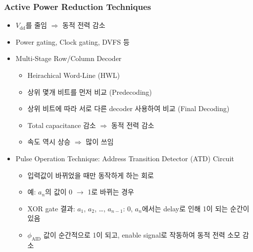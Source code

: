 \subsubsection*{Active Power Reduction Techniques}
\begin{itemize}
    \item $V_{\mathrm{dd}}$를 줄임 $\Rightarrow$ 동적 전력 감소
    \item Power gating, Clock gating, DVFS 등
    \item Multi-Stage Row/Column Decoder
    \begin{itemize}
        \item Heirachical Word-Line (HWL)
        \item 상위 몇개 비트를 먼저 비교 (Predecoding) 
        \item 상위 비트에 따라 서로 다른 decoder 사용하여 비교 (Final Decoding)
        \item Total capacitance 감소 $\Rightarrow$ 동적 전력 감소
        \item 속도 역시 상승 $\Rightarrow$ 많이 쓰임
    \end{itemize}
    \item Pulse Operation Technique: Address Transition Detector (ATD) Circuit
    \begin{itemize}
        \item 입력값이 바뀌었을 때만 동작하게 하는 회로
        \item 예: $a_n$의 값이 0 $\rightarrow$ 1로 바뀌는 경우
        \item XOR gate 결과: $a_1$, $a_2$, \ldots, $a_{n-1}$: 0, $a_n$에서는 delay로 인해 1이 되는 순간이 있음
        \item $\phi_{\mathrm{AID}}$ 값이 순간적으로 1이 되고, enable signal로 작동하여 동적 전력 소모 감소
    \end{itemize}
\end{itemize}

